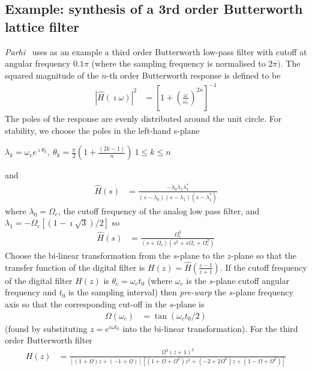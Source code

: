 \documentclass[a4paper,twoside,10pt,english]{report}
\begin{document}
\subsection{\label{sub:Example-butt3NS-synthesis}Example: synthesis of a 3rd order Butterworth lattice filter}
\emph{Parhi}~\cite[Example 12.6.1]{Parhi_VLSIDigitalSignalProcessingSystems}
uses as an example a third order Butterworth low-pass filter with cutoff at 
angular frequency $0.1\pi$ (where the sampling frequency is normalised to 
$2\pi)$. The squared magnitude of the $n$-th order Butterworth response is
defined to be
\begin{align*}
\left|\hat{H}(\imath\omega)\right|^{2} & = \left[1+\left(\frac{\omega}{\omega_{c}}\right)^{2n}\right]^{-1}
\end{align*}
The poles of the response are evenly distributed around the unit circle.
For stability, we choose the poles in the left-hand s-plane
\noindent \begin{center}
$\lambda_{k}=\omega_{c}e^{\imath\theta_{k}},\:\theta_{k}=\frac{\pi}{2}\left(1+\frac{\left(2k-1\right)}{n}\right)\:1\leq k\leq n$
\par\end{center}
and
\begin{align*}
\hat{H}(s) & = \frac{-\lambda_{0}\lambda_{1}\lambda_{1}^{*}}{(s-\lambda_{0})(s-\lambda_{1})(s-\lambda_{1}^{*})}
\end{align*}
where $\lambda_{0}=\Omega_{c}$, the cutoff frequency of the analog
low pass filter, and $\lambda_{1}=-\Omega_{c}\left[\left(1-\imath\sqrt{3}\right)/2\right]$
so
\begin{align*}
\hat{H}(s) & = \frac{\Omega_{c}^{3}}{\left(s+\Omega_{c}\right)\left(s^{2}+s\Omega_{c}+\Omega_{c}^{2}\right)}
\end{align*}
Choose the bi-linear transformation from the $s$-plane to the $z$-plane
so that the transfer function of the digital filter is $H\left(z\right)=\hat{H}(\frac{z-1}{z+1})$.
If the cutoff frequency of the digital filter $H\left(z\right)$ is $\theta_{c}=\omega_{c}t_{0}$
(where $\omega_{c}$ is the $s$-plane cutoff angular frequency and
$t_{0}$ is the sampling interval) then \emph{pre-warp} the $s$-plane
frequency axis so that the corresponding cut-off in the $s$-plane
is
\begin{align*}
\Omega(\omega_{c}) & = \tan(\omega_{c}t_{0}/2)
\end{align*}
(found by substituting $z=e^{i\omega t_{0}}$ into the bi-linear transformation).
For the third order Butterworth filter 
\begin{align*}
H\left(z\right) & = \frac{\Omega^{3}(z+1)^{3}}
{\left[\left(1+\Omega\right)z+\left(-1+\Omega\right)\right]
 \left[\left(1+\Omega+\Omega^{2}\right)z^{2}+
       \left(-2+2\Omega^{2}\right)z+\left(1-\Omega+\Omega^{2}\right)\right]}
\end{align*}
\end{document}
